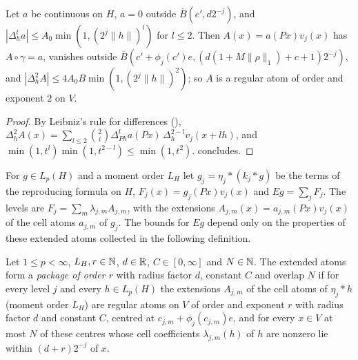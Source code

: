 \begin{lemma}
\label{lem:extended-atoms}
\leanok
{}
Let $a$ be continuous on $H$, $a = 0$ outside $\overline{B}(c', d 2^{-j})$, and
$|\Delta_h^l a| \leq A_0 \min(1, (2^j \|h\|)^l)$ for $l \leq 2$. Then $A(x) = a(Px) v_j(x)$ has
$A \circ \gamma = a$, vanishes outside
$\overline{B}(c' + \phi_j(c') e, (d (1 + M \|\rho\|_1) + c + 1) 2^{-j})$, and
$|\Delta_h^2 A| \leq 4 A_0 B \min(1, (2^j \|h\|)^2)$; so $A$ is a regular atom of order and exponent
$2$ on $V$.
\end{lemma}

\begin{proof}
\leanok
By Leibniz's rule for differences (),
$\Delta_h^2 A(x) = \sum_{l \leq 2} \binom{2}{l} \Delta_{Ph}^l a(Px) \, \Delta_h^{2 - l} v_j(x + lh)$,
and $\min(1, t^l) \min(1, t^{2-l}) \leq \min(1, t^2)$.  concludes.
\end{proof}

For $g \in L_p(H)$ and a moment order $L_H$ let $g_j = \eta_j * (k_j * g)$ be the terms of the
reproducing formula on $H$, $F_j(x) = g_j(Px) v_j(x)$ and $E g = \sum_j F_j$. The levels are
$F_j = \sum_m \lambda_{j,m} A_{j,m}$, with the extensions $A_{j,m}(x) = a_{j,m}(Px) v_j(x)$ of the
cell atoms $a_{j,m}$ of $g_j$. The bounds for $E g$ depend only on the properties of these
extended atoms collected in the following definition.

\begin{definition}
\label{def:extension-atom-package}
\leanok
{}
Let $1 \leq p < \infty$, $L_H, r \in \mathbb{N}$, $d \in \mathbb{R}$, $C \in [0, \infty]$ and $N \in \mathbb{N}$. The
extended atoms form a \emph{package of order $r$} with radius factor $d$, constant $C$ and overlap
$N$ if for every level $j$ and every $h \in L_p(H)$ the extensions $A_{j,m}$ of the cell atoms of
$\eta_j * h$ (moment order $L_H$) are regular atoms on $V$ of order and exponent $r$ with radius
factor $d$ and constant $C$, centred at $c_{j,m} + \phi_j(c_{j,m}) e$, and for every $x \in V$ at
most $N$ of these centres whose cell coefficients $\lambda_{j,m}(h)$ of $h$ are nonzero lie
within $(d + r) 2^{-j}$ of $x$.
\end{definition}

